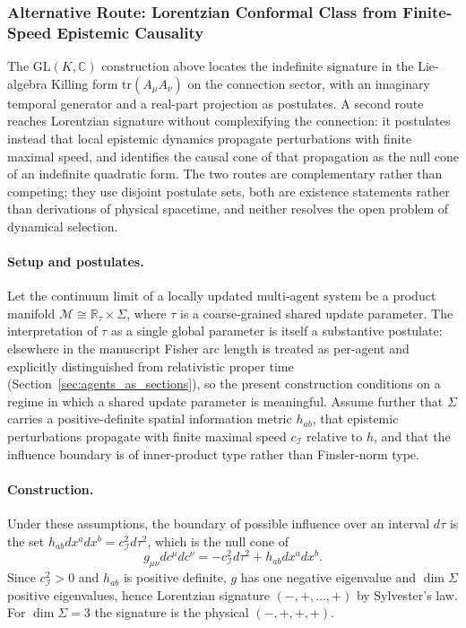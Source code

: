 \documentclass[11pt]{article}
\begin{document}
\subsubsection{Alternative Route: Lorentzian Conformal Class from Finite-Speed Epistemic Causality}
\label{sec:causal_cone_route}

The $\mathrm{GL}(K,\mathbb{C})$ construction above locates the indefinite signature in the Lie-algebra Killing form $\mathrm{tr}(A_\mu A_\nu)$ on the connection sector, with an imaginary temporal generator and a real-part projection as postulates. A second route reaches Lorentzian signature without complexifying the connection: it postulates instead that local epistemic dynamics propagate perturbations with finite maximal speed, and identifies the causal cone of that propagation as the null cone of an indefinite quadratic form. The two routes are complementary rather than competing; they use disjoint postulate sets, both are existence statements rather than derivations of physical spacetime, and neither resolves the open problem of dynamical selection.

\paragraph{Setup and postulates.}
Let the continuum limit of a locally updated multi-agent system be a product manifold $\mathcal{M} \cong \mathbb{R}_\tau \times \Sigma$, where $\tau$ is a coarse-grained shared update parameter. The interpretation of $\tau$ as a single global parameter is itself a substantive postulate: elsewhere in the manuscript Fisher arc length is treated as per-agent and explicitly distinguished from relativistic proper time (Section~\ref{sec:agents_as_sections}), so the present construction conditions on a regime in which a shared update parameter is meaningful. Assume further that $\Sigma$ carries a positive-definite spatial information metric $h_{ab}$, that epistemic perturbations propagate with finite maximal speed $c_\mathcal{I}$ relative to $h$, and that the influence boundary is of inner-product type rather than Finsler-norm type.

\paragraph{Construction.}
Under these assumptions, the boundary of possible influence over an interval $d\tau$ is the set $h_{ab} dx^a dx^b = c_\mathcal{I}^2 d\tau^2$, which is the null cone of
\begin{equation}
g_{\mu\nu} dc^\mu dc^\nu = -c_\mathcal{I}^2 d\tau^2 + h_{ab} dx^a dx^b.
\label{eq:causal_cone_metric}
\end{equation}
Since $c_\mathcal{I}^2 > 0$ and $h_{ab}$ is positive definite, $g$ has one negative eigenvalue and $\dim\Sigma$ positive eigenvalues, hence Lorentzian signature $(-,+,\ldots,+)$ by Sylvester's law. For $\dim\Sigma = 3$ the signature is the physical $(-,+,+,+)$.
\end{document}
